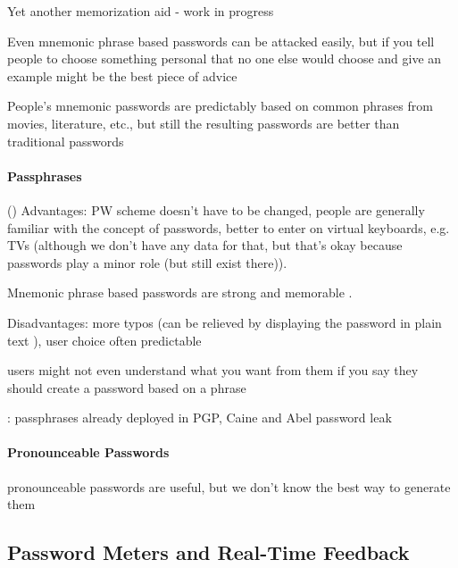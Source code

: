 	Yet another memorization aid - work in progress \cite{Lyastani2016PWMangling} 
	
	Even mnemonic phrase based passwords can be attacked easily, but if you tell people to choose something personal that no one else would choose and give an example might be the best piece of advice \cite{Yang2016MnemonicSentenceBased}
	
	People's mnemonic passwords are predictably based on common phrases from movies, literature, etc., but still the resulting passwords are better than traditional passwords \cite{Kuo2006HumanSelectionMnemonic}
	
	\paragraph{Passphrases}\label{sec:rw:passphrases}
	()
	Advantages: PW scheme doesn't have to be changed, people are generally familiar with the concept of passwords, better to enter on virtual keyboards, e.g. TVs (although we don't have any data for that, but that's okay because passwords play a minor role (but still exist there)).
	
	Mnemonic phrase based passwords are strong and memorable \cite{Yan2004PasswordMemorabilitySecurity}.
	
	\cite{Keith2009PassphraseDesign}
	
	Disadvantages: more typos (can be relieved by displaying the password in plain text  \cite{Melicher2016UsabilityMobileTextPasswords}), user choice often predictable
	
	users might not even understand what you want from them if you say they should create a password based on a phrase \cite{Forget2007HelpingUsers}
	
	\cite{Bonneau2012LinguisticProperties}: passphrases already deployed in PGP, Caine and Abel password leak \cite{Carnavalet2014AnalyzingPWStrengthMeters} 
	
	\cite{Shay2012CorrectHorseBatteryStaple}
	
	
	\paragraph{Pronounceable Passwords}
	pronounceable passwords are useful, but we don't know the best way to generate them \cite{Goldberg2015UnspeakablePasswords}
	
	
	\subsection{Password Meters and Real-Time Feedback}
	
